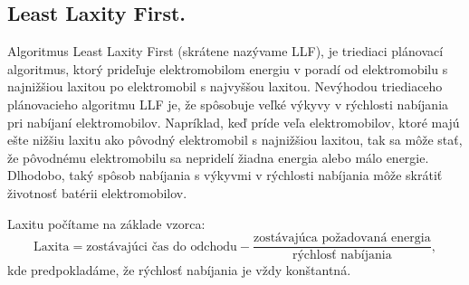 \subsection{Least Laxity First.}
Algoritmus Least Laxity First (skrátene nazývame LLF), je triediaci plánovací algoritmus, ktorý prideľuje elektromobilom energiu v poradí od elektromobilu s najnižšiou laxitou po elektromobil s najvyššou laxitou. Nevýhodou triediaceho plánovacieho algoritmu LLF je, že spôsobuje veľké výkyvy v rýchlosti nabíjania pri nabíjaní elektromobilov. Napríklad, keď príde veľa elektromobilov, ktoré majú ešte nižšiu laxitu ako pôvodný elektromobil s najnižšiou laxitou, tak sa môže stať, že pôvodnému elektromobilu sa nepridelí žiadna energia alebo málo energie. Dlhodobo, taký spôsob nabíjania s výkyvmi v rýchlosti nabíjania môže skrátiť životnosť batérii elektromobilov.\cite{chen2021smoothed}


Laxitu počítame na základe vzorca:
\begin{equation}
    \text{Laxita} = \text{zostávajúci čas do odchodu} - \frac{\text{zostávajúca požadovaná energia}}{\text{rýchlosť nabíjania}},
\end{equation}
kde predpokladáme, že rýchlosť nabíjania je vždy konštantná.


